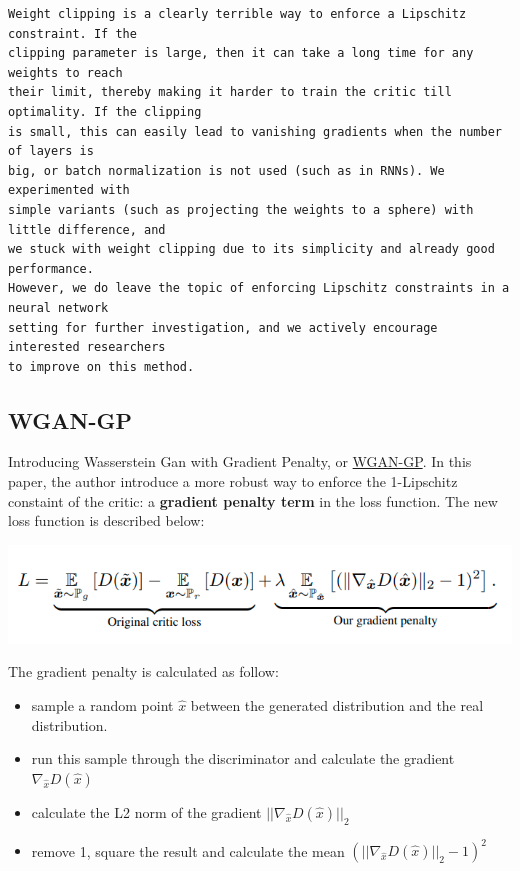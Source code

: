 \begin{lstlisting}
Weight clipping is a clearly terrible way to enforce a Lipschitz constraint. If the
clipping parameter is large, then it can take a long time for any weights to reach
their limit, thereby making it harder to train the critic till optimality. If the clipping
is small, this can easily lead to vanishing gradients when the number of layers is
big, or batch normalization is not used (such as in RNNs). We experimented with
simple variants (such as projecting the weights to a sphere) with little difference, and
we stuck with weight clipping due to its simplicity and already good performance.
However, we do leave the topic of enforcing Lipschitz constraints in a neural network
setting for further investigation, and we actively encourage interested researchers
to improve on this method.
\end{lstlisting}

\subsection{WGAN-GP}

Introducing Wasserstein Gan with Gradient Penalty, or
\href{https://arxiv.org/pdf/1704.00028.pdf}{WGAN-GP}. In this paper, the
author introduce a more robust way to enforce the 1-Lipschitz constaint
of the critic: a \textbf{gradient penalty term} in the loss function.
The new loss function is described below:

\includegraphics[width=1\linewidth]{img//genAdvNet//modernGAN/wgan_gp.png}

The gradient penalty is calculated as follow: 
\begin{itemize}
    \item sample a random point \(\hat{x}\) between the generated distribution and the real distribution.
    \item run this sample through the discriminator and calculate the gradient \(\nabla_{\hat{x}} D(\hat{x})\)
    \item calculate the L2 norm of the gradient \(|| \nabla_{\hat{x}} D(\hat{x}) ||_{2}\)
    \item remove 1, square the result and calculate the mean \((|| \nabla_{\hat{x}} D(\hat{x}) ||_{2} - 1) ^{2}\)
\end{itemize}

